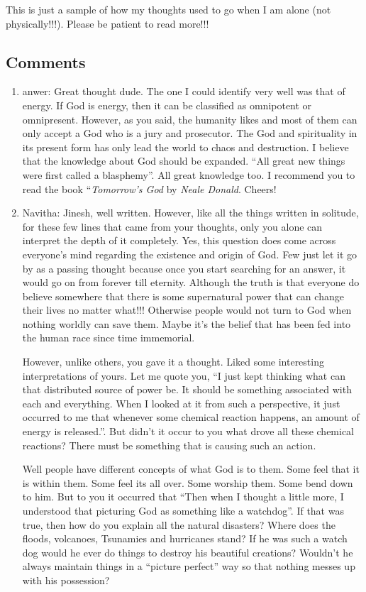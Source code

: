 This is just a sample of how my thoughts used to go when I am alone (not physically!!!). Please be patient to read more!!!

\subsection*{Comments}
\begin{enumerate}
\item{anwer: }
Great thought dude. The one I could identify very well was that of energy. If God is energy, then it can be classified as omnipotent or omnipresent. However, as you said, the humanity likes and most of them can only accept a God who is a jury and prosecutor. The God and spirituality in its present form has only lead the world to chaos and destruction. I believe that the knowledge about God should be expanded. ``All great new things were first called a blasphemy''. All great knowledge too. I recommend you to read the book ``\emph{Tomorrow's God} by \emph{Neale Donald}. Cheers!

\item{Navitha: }
Jinesh, well written. However, like all the things written in solitude, for these few lines that came from your thoughts, only you alone can interpret the depth of it completely. Yes, this question does come across everyone's mind regarding the existence and origin of God. Few just let it go by as a passing thought because once you start searching for an answer, it would go on from forever till eternity. Although the truth is that everyone do believe somewhere that there is some supernatural power that can change their lives no matter what!!! Otherwise people would not turn to God when nothing worldly can save them. Maybe it's the belief that has been fed into the human race since time immemorial.

However, unlike others, you gave it a thought. Liked some interesting interpretations of yours.
Let me quote you, ``I just kept thinking what can that distributed source of power be. It should be something associated with each and everything. When I looked at it from such a perspective, it just occurred to me that whenever some chemical reaction happens, an amount of energy is released.''. But didn't it occur to you what drove all these chemical reactions? There must be something that is causing such an action.

Well people have different concepts of what God is to them. Some feel that it is within them. Some feel its all over. Some worship them. Some bend down to him.
But to you it occurred that “Then when I thought a little more, I understood that picturing God as something like a watchdog”. If that was true, then how do you explain all the natural disasters? Where does the floods, volcanoes, Tsunamies and hurricanes stand? If he was such a watch dog would he ever do things to destroy his beautiful creations? Wouldn't he always maintain things in a ``picture perfect'' way so that nothing messes up with his possession?



\end{enumerate}
